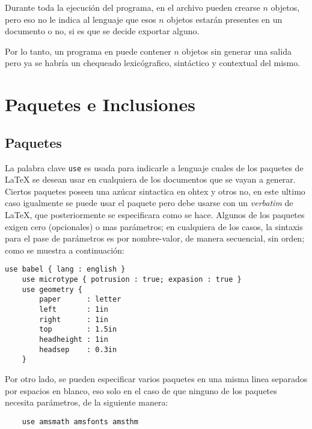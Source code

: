 \documentclass[12pt,letterpaper,titlepage,oneside,openright]{book}
\newcommand{\OhTeX}{%
    \makebox[0.76em][c]{O}%
    \makebox[0.25em][c]{%
        \raisebox{0.14em}[0em][0em]{%
            \fontsize{0.5em}{0cm}%
                \selectfont H%
        }%
    }%
    \makebox[1.35em][c]{\TeX}%
}
\newcommand{\latex}{\LaTeX\xspace}
\newcommand{\ohtex}{\OhTeX\xspace}
\begin{document}
Durante toda la ejecución del programa, en el archivo pueden crearse $n$
objetos, pero eso no le indica al lenguaje que esos $n$ objetos estarán
presentes en un documento o no, si es que se decide exportar alguno.

Por lo tanto, un programa en \ohtex puede contener $n$ objetos sin generar una salida pero ya se habría un chequeado lexicógrafico, sintáctico y contextual del mismo. 

\section{Paquetes e Inclusiones}

\subsection{Paquetes}

La palabra clave \texttt{use} es usada para indicarle a lenguaje cuales de los
paquetes de \latex se desean usar en cualquiera de los documentos que se vayan a
generar. Ciertos paquetes poseen una azúcar sintactica en ohtex y otros no, en este ultimo caso igualmente se puede usar el paquete pero debe usarse con un \textit{verbatim} de \latex, que posteriormente se especificara como se hace. Algunos de los paquetes exigen cero (opcionales) o mas parámetros; en
cualquiera de los casos, la sintaxis para el pase de parámetros es por nombre-valor, de manera secuencial, sin orden; 
como se muestra a continuación:

\begin{center}
\begin{lstlisting}[caption={Paquetes},label=pkgs]
    use babel { lang : english }
    use microtype { potrusion : true; expasion : true }
    use geometry {
        paper      : letter
        left       : 1in
        right      : 1in
        top        : 1.5in
        headheight : 1in
        headsep    : 0.3in
    }
\end{lstlisting}
\end{center}

Por otro lado, se pueden especificar varios paquetes en una misma linea separados por espacios en blanco, eso
solo en el caso de que ninguno de los paquetes necesita parámetros, de la
siguiente manera:

\begin{center}
\begin{lstlisting}
    use amsmath amsfonts amsthm
\end{lstlisting}
\end{center}
\end{document}
